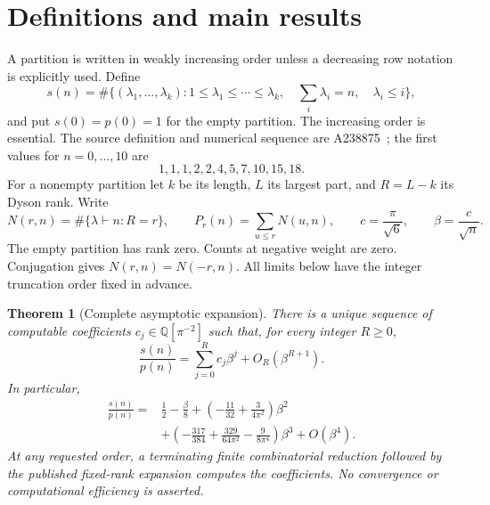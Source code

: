 \documentclass[11pt,letterpaper]{article}
\numberwithin{equation}{section}
\newtheorem{theorem}{Theorem}[section]
\theoremstyle{remark}\newtheorem{remark}[theorem]{Remark}
\newcommand{\QQ}{\mathbb Q}
\begin{document}
\section{Definitions and main results}\label{dgp:sub:sec:main}
A partition is written in weakly increasing order unless a decreasing
row notation is explicitly used. Define
\[
 s(n)=\#\{(\lambda_1,\ldots,\lambda_k):
 1\leq\lambda_1\leq\cdots\leq\lambda_k,\quad
 \textstyle\sum_i\lambda_i=n,\quad\lambda_i\leq i\},
\]
and put $s(0)=p(0)=1$ for the empty partition. The increasing order is
essential. The source definition and numerical sequence are
A238875~\cite{oeisA238875}; the first values for $n=0,\ldots,10$ are
\[
 1,1,1,2,2,4,5,7,10,15,18.
\]
For a nonempty partition let $k$ be its length, $L$ its largest part,
and $R=L-k$ its Dyson rank. Write
\[
 N(r,n)=\#\{\lambda\vdash n:R=r\},\qquad
 P_r(n)=\sum_{u\leq r}N(u,n),\qquad c=\frac\pi{\sqrt6},
 \qquad \beta=\frac c{\sqrt n}.
\]
The empty partition has rank zero. Counts at negative weight are zero.
Conjugation gives $N(r,n)=N(-r,n)$.
All limits below have the integer truncation order fixed in advance.

\begin{theorem}[Complete asymptotic expansion]\label{dgp:sub:thm:allorders}
There is a unique sequence of computable coefficients
$c_j\in\QQ[\pi^{-2}]$ such that, for every integer $R\geq0$,
\begin{equation}\label{dgp:sub:eq:allorders}
 \frac{s(n)}{p(n)}=\sum_{j=0}^{R}c_j\beta^j
                   +O_R(\beta^{R+1}).
\end{equation}
In particular,
\begin{align}\label{dgp:sub:eq:cubic}
 \frac{s(n)}{p(n)}={}&\frac12-\frac\beta8
 +\left(-\frac{11}{32}+\frac3{4\pi^2}\right)\beta^2\nonumber\\
 &+\left(-\frac{317}{384}+\frac{329}{64\pi^2}
                 -\frac9{8\pi^4}\right)\beta^3+O(\beta^4).
\end{align}
At any requested order, a terminating finite combinatorial reduction
followed by the published fixed-rank expansion computes the
coefficients. No convergence or computational efficiency is asserted.
\end{theorem}
\end{document}
